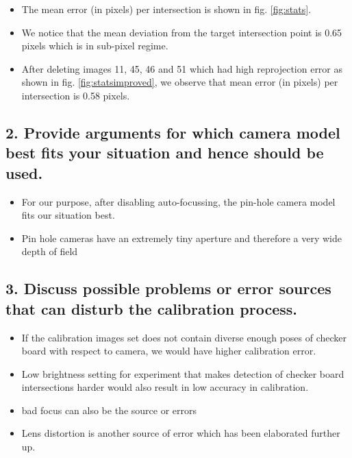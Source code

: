 \begin{itemize}
\item The mean error (in pixels) per intersection is shown in fig. \ref{fig:stats}.
\item We notice that the mean deviation from the target intersection point is 0.65 pixels which is in sub-pixel regime.
\item After deleting images 11, 45, 46 and 51 which had high reprojection error as shown in fig. \ref{fig:statsimproved}, we observe that mean error (in pixels) per intersection is 0.58 pixels.
\end{itemize}
\subsection*{2. Provide arguments for which camera model best fits your situation and hence should be used.}
\begin{itemize}
\item For our purpose, after disabling auto-focussing, the pin-hole camera model fits our situation best.
\item Pin hole cameras have an extremely tiny aperture and therefore a very wide depth of field
\end{itemize}

\subsection*{3. Discuss possible problems or error sources that can disturb the calibration process.}
\begin{itemize}
\item If the calibration images set does not contain diverse enough poses of checker board with respect to camera, we would have higher calibration error.
\item Low brightness setting for experiment that makes detection of checker board intersections harder would also result in low accuracy in calibration.
\item  bad focus can also be the source or errors
\item Lens distortion is another source of error which has been elaborated further up.
\end{itemize}


